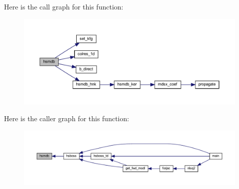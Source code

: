 Here is the call graph for this function\+:\nopagebreak
\begin{figure}[H]
\begin{center}
\leavevmode
\includegraphics[width=350pt]{Leroi_8f90_a48d6fa7ecaca60caaf9ecba957eaa3b1_cgraph}
\end{center}
\end{figure}
Here is the caller graph for this function\+:\nopagebreak
\begin{figure}[H]
\begin{center}
\leavevmode
\includegraphics[width=350pt]{Leroi_8f90_a48d6fa7ecaca60caaf9ecba957eaa3b1_icgraph}
\end{center}
\end{figure}
\mbox{\label{Leroi_8f90_aa0252ede97751947c4c840de4179175d}} 
